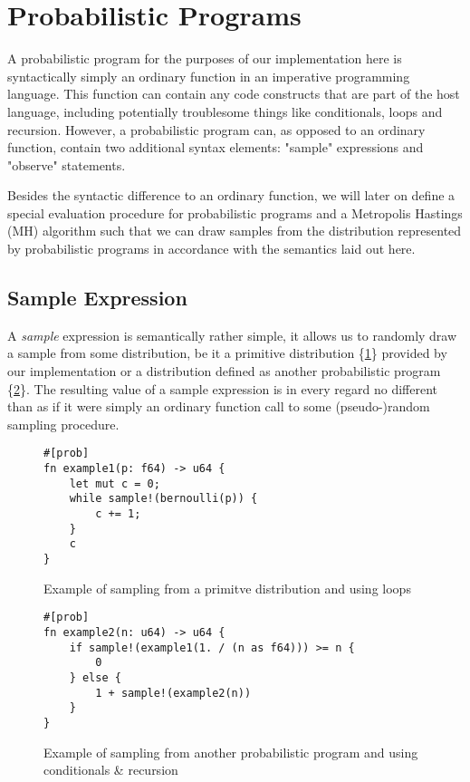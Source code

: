\section{Probabilistic Programs}

A probabilistic program for the purposes of our implementation here is syntactically simply an ordinary function in an imperative programming language. This function can contain any code constructs that are part of the host language, including potentially troublesome things like conditionals, loops and recursion. However, a probabilistic program can, as opposed to an ordinary function, contain two additional syntax elements: "sample" expressions and "observe" statements.

Besides the syntactic difference to an ordinary function, we will later on define a special evaluation procedure for probabilistic programs and a Metropolis Hastings (MH) algorithm such that we can draw samples from the distribution represented by probabilistic programs in accordance with the semantics laid out here.

\subsection{Sample Expression}

A \textit{sample} expression is semantically rather simple, it allows us to randomly draw a sample from some distribution, be it a primitive distribution \{\ref{example1}\} provided by our implementation or a distribution defined as another probabilistic program \{\ref{example2}\}. The resulting value of a sample expression is in every regard no different than as if it were simply an ordinary function call to some (pseudo-)random sampling procedure.

\begin{figure}[h]
\begin{lstlisting}
#[prob]
fn example1(p: f64) -> u64 {
    let mut c = 0;
    while sample!(bernoulli(p)) {
        c += 1;
    }
    c
}
\end{lstlisting}
\caption{Example of sampling from a primitve distribution and using loops}
\label{example1}
\end{figure}

\begin{figure}[h]
\begin{lstlisting}
#[prob]
fn example2(n: u64) -> u64 {
    if sample!(example1(1. / (n as f64))) >= n {
        0
    } else {
        1 + sample!(example2(n))
    }
}
\end{lstlisting}
\caption{Example of sampling from another probabilistic program and using conditionals \& recursion}
\label{example2}
\end{figure}


